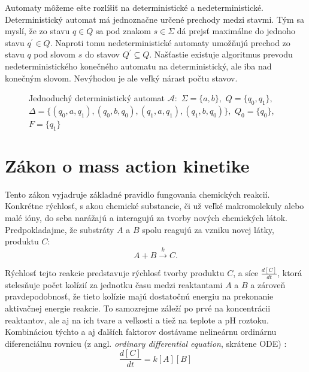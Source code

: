 \documentclass[11pt,final,oneside]{fithesis}
\begin{document}
Automaty m\^ o\v zeme e\v ste rozl\'i\v si\v t na deterministick\'e a nedeterministick\'e. Deterministick\' y automat m\'a jednozna\v cne ur\v cen\'e prechody 
medzi stavmi. T\'ym sa mysl\'i, \v ze zo stavu $q \in Q$ sa pod znakom $s \in \Sigma$ d\'a prejs\v t maxim\'alne do jednoho stavu $q^{'} \in Q$. Naproti tomu
nedeterministick\'e automaty umo\v z\v nuj\'u prechod zo stavu $q$ pod slovom $s$ do stavov $Q^{'} \subseteq Q$. Na\v s\v tastie existuje algoritmus prevodu 
nedeterministick\'eho kone\v cn\'eho automatu  na deterministick\'y, ale iba nad kone\v cn\'ym slovom. Nev\'yhodou je ale ve\v lk\'y n\'arast po\v ctu stavov.
\cite{Clarke:MC:BA}
\begin{figure}[h]
\centering
{}
\caption{Jednoduch\'y deterministick\'y automat $\mathcal{A} :$ $\Sigma = \{a,b\},$ $Q = \{q_0,q_1\},$ $\Delta = \{(q_0,a,q_1),(q_0,b,q_0),(q_1,a,q_1),(q_1,b,q_0)\},$ 
	$Q_0 = \{q_0\}$, $F = \{q_1\}$}
\label{fig:buchi}
\end{figure}

\section{Z\'akon o mass action kinetike}
\label{sec:massAction}
Tento z\'akon vyjadruje z\'akladn\'e pravidlo fungovania chemick\'ych reakci\'i. Konkr\'etne r\'ychlos\v t, s akou chemick\'e substancie, \v ci u\v z 
ve\v lk\'e makromolekuly alebo mal\'e i\'ony, do seba nar\'a\v zaj\'u a interaguj\'u za tvorby nov\'ych chemick\'ych l\'atok. Predpokladajme, \v ze
substr\'aty $A$ a $B$ spolu reaguj\'u za vzniku novej l\'atky, produktu $C$:
\begin{equation}
\label{eq:simpleReaction}
A + B \overset{k}{\longrightarrow} C.
\end{equation}

R\'ychlos\v t tejto reakcie predstavuje r\'ychlos\v t tvorby produktu $C$, a s\'ice $\frac{d[C]}{dt}$, ktor\'a steles\v nuje po\v cet kol\'izi\'i za jednotku 
\v casu medzi reaktantami $A$ a $B$ a z\'arove\v n pravdepodobnos\v t, \v ze tieto kol\'izie maj\'u dostato\v cn\'u energiu na prekonanie aktiva\v cnej 
energie reakcie. To samozrejme z\'ale\v z\'i po prv\'e na koncentr\'acii reaktantov, ale aj na ich tvare a ve\v lkosti a tie\v z na teplote a pH roztoku. 
Kombin\'aciou t\'ychto a aj \v dal\v s\'ich faktorov dost\'avame neline\'arnu ordin\'arnu diferenci\'alnu rovnicu (z angl. \textit{ordinary differential 
equation}, skr\'atene ODE) \cite{ODE}:
\begin{equation}
\label{eq:differentialReaction}
\frac{d[C]}{dt} = k[A][B]
\end{equation}
\end{document}
